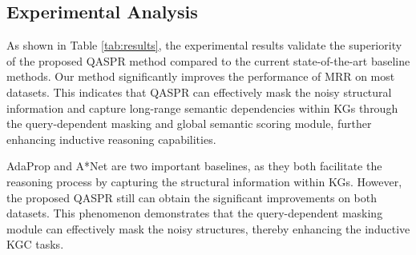 \documentclass[sigconf]{acmart}
\begin{document}
\subsection{Experimental Analysis} 
As shown in Table \ref{tab:results}, the experimental results validate the superiority of the proposed QASPR method compared to the current state-of-the-art baseline methods. Our method significantly improves the performance of MRR on most datasets. This indicates that QASPR can effectively mask the noisy structural information and capture long-range semantic dependencies within KGs through the query-dependent masking and global semantic scoring module, further enhancing inductive reasoning capabilities.

AdaProp\cite{zhang2023adaprop} and A*Net\cite{zhu2023net} are two important baselines, as they both facilitate the reasoning process by capturing the structural information within KGs. However, the proposed QASPR still can obtain the significant improvements on both datasets. This phenomenon demonstrates that the query-dependent masking module can effectively mask the noisy structures, thereby enhancing the inductive KGC tasks.

\end{document}
